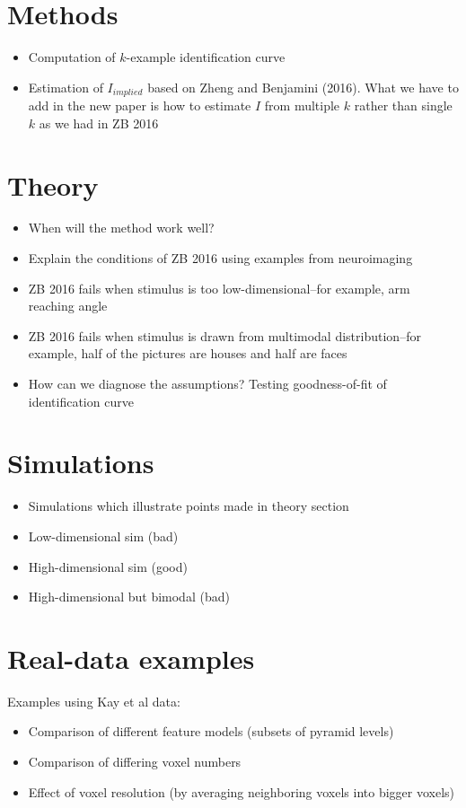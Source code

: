 \documentclass[12pt]{article}
\begin{document}
\section{Methods}

\begin{itemize}
\item Computation of $k$-example identification curve
\item Estimation of $I_{implied}$ based on Zheng and Benjamini (2016). What we have to add in the new paper is how to estimate $I$ from multiple $k$ rather than single $k$ as we had in ZB 2016
\end{itemize}

\section{Theory}

\begin{itemize}
\item When will the method work well?
\item Explain the conditions of ZB 2016 using examples from neuroimaging
\item ZB 2016 fails when stimulus is too low-dimensional--for example, arm reaching angle
\item ZB 2016 fails when stimulus is drawn from multimodal distribution--for example, half of the pictures are houses and half are faces
\item How can we diagnose the assumptions? Testing goodness-of-fit of identification curve
\end{itemize}

\section{Simulations}

\begin{itemize}
\item Simulations which illustrate points made in theory section
\item Low-dimensional sim (bad)
\item High-dimensional sim (good)
\item High-dimensional but bimodal (bad)
\end{itemize}

\section{Real-data examples}

Examples using Kay et al data:
\begin{itemize}
\item Comparison of different feature models (subsets of pyramid levels)
\item Comparison of differing voxel numbers
\item Effect of voxel resolution (by averaging neighboring voxels into bigger voxels)
\end{itemize}

{}

\end{document}
